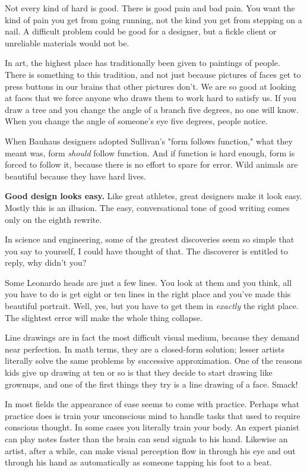 Not every kind of hard is good.  There is good pain and bad pain.
You want the kind of pain you get from going running, not the
kind you get from stepping on a nail.
A difficult
problem could be good for a designer, but a fickle client or unreliable
materials would not be.

In art, the highest place has traditionally been given to
paintings of people.  There is something to this tradition,
and not just because pictures of faces get to press
buttons in our brains that other pictures don't.  We are 
so good at looking at faces that we force anyone who
draws them to work hard to satisfy us.  If you
draw a tree and you change the angle of a branch
five degrees, no one will know.  When you change the angle
of someone's eye five degrees, people notice.

When Bauhaus designers adopted Sullivan's "form follows function,"
what they meant was, form \emph{should} follow function.  And
if function is hard enough, form is forced to follow it,
because there is no effort to spare for error.  Wild animals
are beautiful because they have hard lives.



\textbf{Good design looks easy.}  Like great athletes,
great designers make it look easy.  Mostly this is
an illusion.  The easy, conversational tone of good
writing comes only on the eighth rewrite.

In science and engineering, some of the greatest
discoveries seem so simple that you say to yourself,
I could have thought of that.  The discoverer is
entitled to reply, why didn't you?

Some Leonardo heads are just a few lines.  You look
at them and you think, all you have to do is get eight
or ten lines in the right place and you've made this beautiful
portrait.  Well, yes, but you have to get them in
\emph{exactly} the right place.  The slightest error
will make the whole thing collapse.

Line drawings are in fact the most difficult visual
medium, because they demand near perfection.
In math terms, they are a closed-form solution; lesser  
artists literally solve the same problems by successive
approximation.  One of the reasons kids give up drawing
at ten or so is that they decide to start
drawing like grownups, and one of the first things
they try is a line drawing of a face.  Smack!

In most fields the appearance of ease seems to come with
practice.  Perhaps what practice does is train your
unconscious mind to handle tasks that used to
require conscious thought.  In some cases
you literally train your body.  An expert pianist can
play notes faster than the brain can send signals to
his hand.  
Likewise an artist, after a while, can
make visual perception flow in through his eye and
out through his hand as automatically as someone tapping his foot to
a beat.

